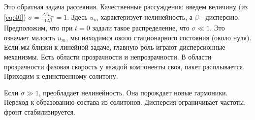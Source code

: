 Это обратная задача рассеяния. Качественные рассуждения: введем величину (из \eqref{eq:40}) $\sigma=\frac{\Delta^2 u_m}{12 \beta}=1$. Здесь $u_m$ характеризует нелинейность, а $\beta$ - дисперсию. Предположим, что при $t=0$ задали такое распределение, что $\sigma \ll 1$. Это означает малость $u_m$, мы находимся около стационарного состояния (около нуля). Если мы близки к линейной задаче, главную роль играют дисперсионные механизмы. Есть области прозрачности и непрозрачности. В области прозрачности фазовая скорость у каждой компоненты своя, пакет расплывается.  Приходим к единственному солитону.

Если  $\sigma \gg 1$, преобладает нелинейность. Она порождает новые гармоники. Переход к образованию состава из солитонов. Дисперсия ограничивает частоты, фронт стабилизируется.

